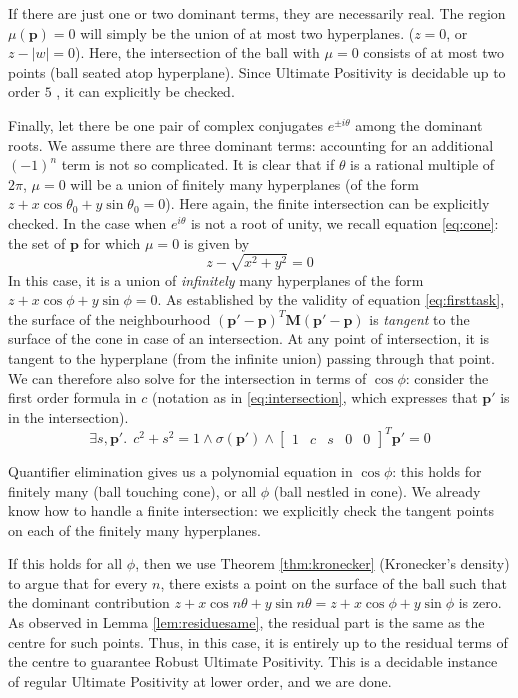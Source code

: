 If there are just one or two dominant terms, they are necessarily real. The region $\mu(\mathbf{p}) = 0$ will simply be the union of at most two hyperplanes. ($z = 0$, or $z - |w| = 0$). Here, the intersection of the ball with $\mu = 0$ consists of at most two points (ball seated atop hyperplane). Since Ultimate Positivity is decidable up to order $5$ \cite{joeljames3}, it can explicitly be checked.

Finally, let there be one pair of complex conjugates $e^{\pm i\theta}$ among the dominant roots. We assume there are three dominant terms: accounting for an additional $(-1)^n$ term is not so complicated. It is clear that if $\theta$ is a rational multiple of $2\pi$, $\mu = 0$ will be a union of finitely many hyperplanes (of the form $z + x\cos \theta_0 + y\sin \theta_0 = 0$). Here again, the finite intersection can be explicitly checked. In the case when $e^{i\theta}$ is not a root of unity, we recall equation \ref{eq:cone}: the set of $\mathbf{p}$ for which $\mu = 0$ is given by
\begin{equation}
z  - \sqrt{x^2 + y^2} = 0
\end{equation}
In this case, it is a union of \textit{infinitely} many hyperplanes of the form $z + x \cos \phi + y\sin \phi = 0$. As established by the validity of equation \ref{eq:firsttask}, the surface of the neighbourhood $(\mathbf{p'} - \mathbf{p})^T\mathbf{M}(\mathbf{p'} - \mathbf{p})$ is \textit{tangent} to the surface of the cone in case of an intersection. At any point of intersection, it is tangent to the hyperplane (from the infinite union) passing through that point. We can therefore also solve for the intersection in terms of $\cos \phi$: consider the first order formula in $c$ (notation as in \ref{eq:intersection}, which expresses that $\mathbf{p'}$ is in the intersection).
$$\exists s, \mathbf{p'}.~~c^2 + s^2 = 1 \land \sigma({\mathbf{p'}}) \land \begin{bmatrix}1 & c & s & 0 & 0 \end{bmatrix}^T\mathbf{p'} = 0 $$

Quantifier elimination gives us a polynomial equation in $\cos \phi$: this holds for finitely many (ball touching cone), or all $\phi$ (ball nestled in cone). We already know how to handle a finite intersection: we explicitly check the tangent points on each of the finitely many hyperplanes.

If this holds for all $\phi$, then we use Theorem \ref{thm:kronecker} (Kronecker's density) to argue that for every $n$, there exists a point on the surface of the ball such that the dominant contribution $z + x\cos n\theta + y\sin n\theta = z + x\cos\phi + y\sin\phi$ is zero. As observed in Lemma \ref{lem:residuesame}, the residual part is the same as the centre for such points. Thus, in this case, it is entirely up to the residual terms of the centre to guarantee Robust Ultimate Positivity. This is a decidable instance of regular Ultimate Positivity at lower order, and we are done.
